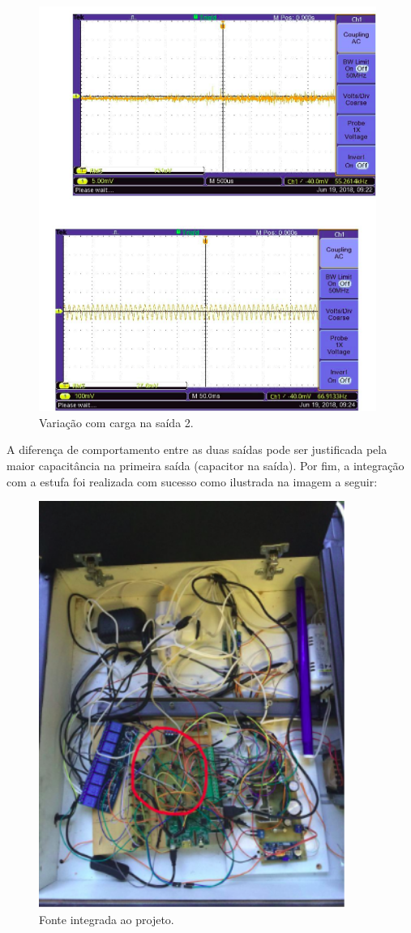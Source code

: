\begin{figure}[H]
	\centering
	\includegraphics[width=11cm]{figuras/variacao2.png}
	\caption{Variação com carga na saída 2.}
	\label{variacao2}
\end{figure}

A diferença de comportamento entre as duas saídas pode ser justificada pela maior capacitância na primeira saída (capacitor na saída).
Por fim, a integração com a estufa foi realizada com sucesso como ilustrada na imagem a seguir:

\begin{figure}[H]
	\centering
	\includegraphics[width=10cm]{figuras/ponteHintegrada.png}
	\caption{Fonte integrada ao projeto.}
	\label{ponteHintegrada}
\end{figure}

